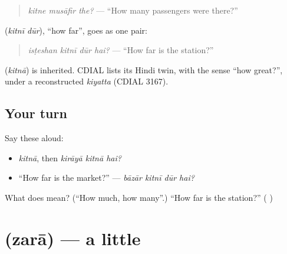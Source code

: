 \begin{quote}
\textbf{  }
\end{quote}

\begin{quote}
\emph{kitne musāfir the?} — \textquotedblleft{}How many passengers were there?\textquotedblright{}
\end{quote}

\textbf{ } (\emph{kitnī dūr}), \textquotedblleft{}how far\textquotedblright{}, goes as one pair:

\begin{quote}
\textbf{   }
\end{quote}

\begin{quote}
\emph{isṭeshan kitnī dūr hai?} — \textquotedblleft{}How far is the station?\textquotedblright{}
\end{quote}

\begin{cousinweb}
\textbf{} (\emph{kitnā}) is inherited. CDIAL lists its Hindi twin, with the sense \textquotedblleft{}how great?\textquotedblright{}, under a reconstructed \emph{kiyatta} (CDIAL 3167).
\end{cousinweb}

\subsection*{Your turn}
Say these aloud:

\begin{itemize}
\raggedright
  \item \emph{kitnā}, then \emph{kirāyā kitnā hai?}
  \item \textquotedblleft{}How far is the market?\textquotedblright{} — \emph{bāzār kitnī dūr hai?}
\end{itemize}

\begin{tcolorbox}[breakable,colback=teal!4,colframe=teal!35!black,title={Before you move on}]
What does \textbf{} mean? (\textquotedblleft{}How much, how many\textquotedblright{}.) \textquotedblleft{}How far is the station?\textquotedblright{} (\textbf{   })
\end{tcolorbox}
\section[\texorpdfstring{\ur{ذرا} (zarā)}{ذرا (zarā)}]{ (zarā) — a little}


